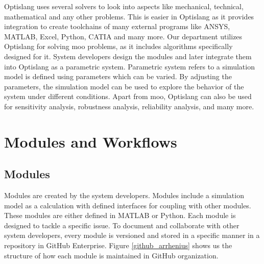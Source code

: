Optislang uses several solvers to look into aspects like mechanical, technical, mathematical and any other problems. This is easier in Optislang as it provides
integration to create toolchains of many external programs like ANSYS, MATLAB, Excel, Python, CATIA and many more. Our department utilizes Optislang for solving 
\acrshort{moo} problems, as it includes algorithms specifically designed for it. System developers design the modules and later integrate them into Optislang 
as a parametric system. Parametric system refers to a simulation model is defined using parameters which can be varied. By adjusting the parameters, the 
simulation model can be used to explore the behavior of the system under different conditions. Apart from \acrshort{moo}, Optislang can also be used for 
sensitivity analysis, robustness analysis, reliability analysis, and many more. 
\section{Modules and Workflows}
\subsection{Modules}
Modules are created by the system developers. Modules include a simulation model as a calculation with defined interfaces for coupling with other modules. 
These modules are either defined in MATLAB or Python. Each module is designed to tackle a specific issue. To document and collaborate with other
system developers, every module is versioned and stored in a specific manner in a repository in GitHub Enterprise. Figure \ref{github_arrhenius} shows us the 
structure of how each module is maintained in GitHub organization.

